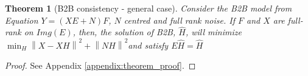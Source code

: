 \documentclass{article}
\newtheorem{theorem}{Theorem}
\begin{document}
\begin{theorem}[B2B consistency - general case]

     Consider the B2B model from Equation $Y = (XE + N)F$, $N$ centred and full rank noise.
     If $F$ and $X$ are full-rank on $Img(E)$, then, the solution of B2B, $\hat H$, will minimize
     $\min_H  \left \| X - XH\right\| ^2  + \left \| NH\right \| ^2$and satisfy $E\hat H = \hat H$
\end{theorem}
%
\begin{proof}
  See Appendix \ref{appendix:theorem_proof}.
\end{proof}
%
%
%
%
\end{document}
